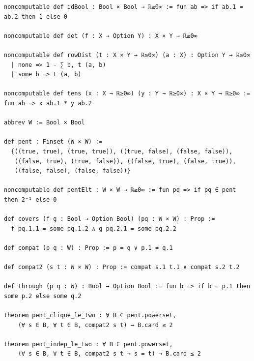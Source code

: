 \begin{lstlisting}
noncomputable def idBool : Bool × Bool → ℝ≥0∞ := fun ab => if ab.1 = ab.2 then 1 else 0

noncomputable def det (f : X → Option Y) : X × Y → ℝ≥0∞

noncomputable def rowDist (t : X × Y → ℝ≥0∞) (a : X) : Option Y → ℝ≥0∞
  | none => 1 - ∑ b, t (a, b)
  | some b => t (a, b)

noncomputable def tens (x : X → ℝ≥0∞) (y : Y → ℝ≥0∞) : X × Y → ℝ≥0∞ := fun ab => x ab.1 * y ab.2

abbrev W := Bool × Bool

def pent : Finset (W × W) :=
  {((true, true), (true, true)), ((true, false), (false, false)),
   ((false, true), (true, false)), ((false, true), (false, true)),
   ((false, false), (false, false))}

noncomputable def pentElt : W × W → ℝ≥0∞ := fun pq => if pq ∈ pent then 2⁻¹ else 0

def covers (f g : Bool → Option Bool) (pq : W × W) : Prop :=
  f pq.1.1 = some pq.1.2 ∧ g pq.2.1 = some pq.2.2

def compat (p q : W) : Prop := p = q ∨ p.1 ≠ q.1

def compat2 (s t : W × W) : Prop := compat s.1 t.1 ∧ compat s.2 t.2

def through (p q : W) : Bool → Option Bool := fun b => if b = p.1 then some p.2 else some q.2

theorem pent_clique_le_two : ∀ B ∈ pent.powerset,
    (∀ s ∈ B, ∀ t ∈ B, compat2 s t) → B.card ≤ 2

theorem pent_indep_le_two : ∀ B ∈ pent.powerset,
    (∀ s ∈ B, ∀ t ∈ B, compat2 s t → s = t) → B.card ≤ 2
\end{lstlisting}

